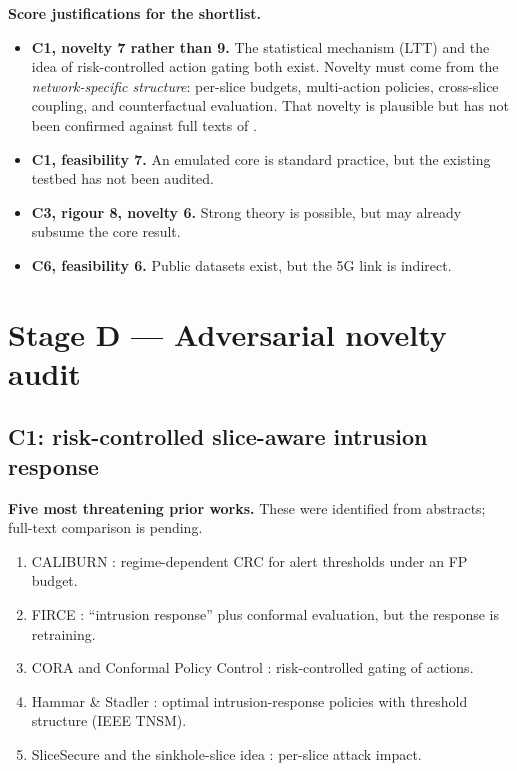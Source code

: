 \textbf{Score justifications for the shortlist.}

\begin{itemize}
\tightlist
\item
  \textbf{C1, novelty 7 rather than 9.} The statistical mechanism (LTT)
  and the idea of risk-controlled action gating \citep{cora2026} both
  exist. Novelty must come from the \emph{network-specific structure}:
  per-slice budgets, multi-action policies, cross-slice coupling, and
  counterfactual evaluation. That novelty is plausible but has not been
  confirmed against full texts of
  \citep{youssef2026caliburn, rbsid2025, cpc2026}.
\item
  \textbf{C1, feasibility 7.} An emulated core is standard practice, but
  the existing testbed has not been audited.
\item
  \textbf{C3, rigour 8, novelty 6.} Strong theory is possible, but
  \citep{fellouris2016second} may already subsume the core result.
\item
  \textbf{C6, feasibility 6.} Public datasets exist, but the 5G link is
  indirect.
\end{itemize}

\hypertarget{sec:audit}{%
\section{Stage D --- Adversarial novelty audit}\label{sec:audit}}

\hypertarget{c1-risk-controlled-slice-aware-intrusion-response}{%
\subsection{C1: risk-controlled slice-aware intrusion
response}\label{c1-risk-controlled-slice-aware-intrusion-response}}

\textbf{Five most threatening prior works.} These were identified from
abstracts; full-text comparison is pending.

\begin{enumerate}
\def\labelenumi{\arabic{enumi}.}
\tightlist
\item
  CALIBURN \citep{youssef2026caliburn}: regime-dependent CRC for alert
  thresholds under an FP budget.
\item
  FIRCE \citep{barrett2026firce}: ``intrusion response'' plus conformal
  evaluation, but the response is retraining.
\item
  CORA and Conformal Policy Control \citep{cora2026, cpc2026}:
  risk-controlled gating of actions.
\item
  Hammar \& Stadler
  \citep{hammar2022optimalstopping, hammar2024dynamic}: optimal
  intrusion-response policies with threshold structure (IEEE TNSM).
\item
  SliceSecure and the sinkhole-slice idea \citep{khan2023slicesecure}:
  per-slice attack impact.
\end{enumerate}

